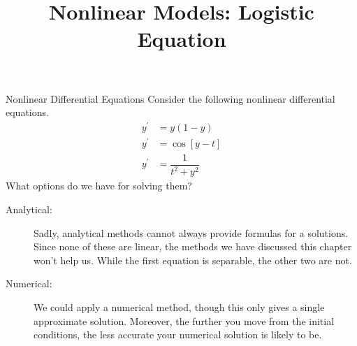 \documentclass{beamer}
\title[MATH 2250 - Section 2.5]{Nonlinear Models: Logistic Equation}
\begin{document}
\begin{frame}
\titlepage
\end{frame}

\begin{frame}
\begin{block}{Nonlinear Differential Equations}
Consider the following nonlinear differential equations.
\begin{equation*}
\begin{aligned}
y^\prime &= y(1-y) \\
y^\prime &= \cos[y-t] \\
y^\prime &= \dfrac{1}{t^2+y^2}
\end{aligned}
\end{equation*}
What options do we have for solving them?\pause

\begin{description}
\item[Analytical:] Sadly, analytical methods cannot always provide formulas for a solutions. Since none of these are linear, the methods we have discussed this chapter won't help us. While the first equation is separable, the other two are not.

\item[Numerical:] We could apply a numerical method, though this only gives a single approximate solution. Moreover, the further you move from the initial conditions, the less accurate your numerical solution is likely to be.
\end{description}
\end{block}
\end{frame}
\end{document}
